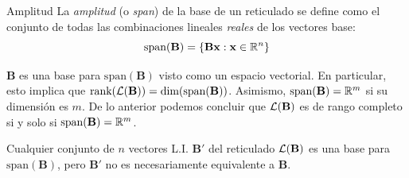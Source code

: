 \begin{frame}
\end{frame}

\begin{frame}{Amplitud}
La {\it amplitud} (o {\it span}) de la base de un reticulado se define como el conjunto de todas las combinaciones lineales {\it reales} de los vectores base:
\[
\text{span}(\mathbf B) = \left\{\mathbf{Bx} : \mathbf x \in \mathbb{R}^n \right\}
\]

$\mathbf B$ es una base para $\text{span}(\mathbf{B})$ visto como un espacio vectorial. En particular, esto implica que $\text{rank}(\mathcal{L}(\mathbf{B})) = \text{dim}(\text{span}(\mathbf B))$. Asimismo, $\text{span}(\mathbf B) = \mathbb{R}^m$ si su dimensión es $m$. De lo anterior podemos concluir que $\mathcal{L}(\mathbf{B})$ es de rango completo si y solo si $\text{span}(\mathbf B) = \mathbb{R}^m$.

\begin{remark}
Cualquier conjunto de $n$ vectores L.I. $\mathbf B'$ del reticulado $\mathcal{L}(\mathbf{B})$ es una base para $\text{span}(\mathbf B)$, pero $\mathbf B'$ no es necesariamente equivalente a $\mathbf B$.
\end{remark}
\end{frame}

